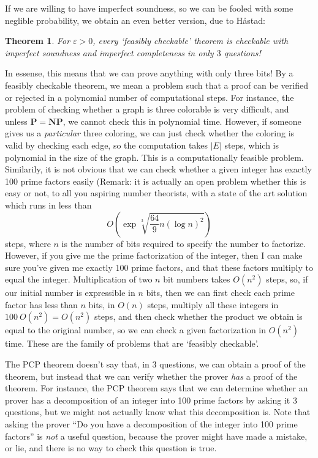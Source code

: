 \documentclass{article}
\theoremstyle{plain}
\newtheorem{theorem}{Theorem}
\theoremstyle{definition}
\begin{document}
If we are willing to have imperfect soundness, so we can be fooled with some neglible probability, we obtain an even better version, due to H\r{a}stad:

\begin{theorem}
    For $\varepsilon > 0$, every `feasibly checkable' theorem is checkable with imperfect soundness and imperfect completeness in only $3$ questions!
\end{theorem}

In essense, this means that we can prove anything with only three bits! By a feasibly checkable theorem, we mean a problem such that a proof can be verified or rejected in a polynomial number of computational steps. For instance, the problem of checking whether a graph is three colorable is very difficult, and unless $\mathbf{P} = \mathbf{NP}$, we cannot check this in polynomial time. However, if someone gives us a {\it particular} three coloring, we can just check whether the coloring is valid by checking each edge, so the computation takes $|E|$ steps, which is polynomial in the size of the graph. This is a computationally feasible problem. Similarily, it is not obvious that we can check whether a given integer has exactly 100 prime factors easily (Remark: it is actually an open problem whether this is easy or not, to all you aspiring number theorists, with a state of the art solution which runs in less than
%
\[ O \left(\exp \sqrt[3]{\frac{64}{9} n (\log n)^2 } \right) \]
%
steps, where $n$ is the number of bits required to specify the number to factorize. However, if you give me the prime factorization of the integer, then I can make sure you've given me exactly 100 prime factors, and that these factors multiply to equal the integer. Multiplication of two $n$ bit numbers takes $O(n^2)$ steps, so, if our initial number is expressible in $n$ bits, then we can first check each prime factor has less than $n$ bits, in $O(n)$ steps, multiply all these integers in $100\ O(n^2) = O(n^2)$ steps, and then check whether the product we obtain is equal to the original number, so we can check a given factorization in $O(n^2)$ time. These are the family of problems that are `feasibly checkable'.

The PCP theorem doesn't say that, in 3 questions, we can obtain a proof of the theorem, but instead that we can verify whether the prover {\it has} a proof of the theorem. For instance, the PCP theorem says that we can determine whether an prover has a decomposition of an integer into 100 prime factors by asking it 3 questions, but we might not actually know what this decomposition is. Note that asking the prover ``Do you have a decomposition of the integer into 100 prime factors'' is {\it not} a useful question, because the prover might have made a mistake, or lie, and there is no way to check this question is true.
\end{document}
